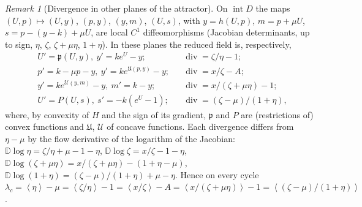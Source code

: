\documentclass[11pt,a4paper]{article}
\numberwithin{equation}{section}
\theoremstyle{remark}\newtheorem{remark}[theorem]{Remark}
\newcommand{\avg}[1]{\left\langle #1\right\rangle}
\DeclareMathOperator{\inter}{int}
\DeclareMathOperator{\diver}{div}
\begin{document}
\begin{remark}[Divergence in other planes of the attractor]\label{rem:planes}
On $\inter D$ the maps $(U,p)\mapsto(U,y)$, $(p,y)$, $(y,m)$, $(U,s)$, with $y=h(U,p)$, $m=p+\mu U$,
$s=p-(y-k)+\mu U$, are local $C^1$ diffeomorphisms (Jacobian determinants, up to sign, $\eta$, $\zeta$, $\zeta+\mu\eta$, $1+\eta$). In
these planes the reduced field is, respectively,
\[
\begin{aligned}
&U'=\mathfrak p(U,y),\ y'=ke^{U}-y;&&\diver=\zeta/\eta-1;\\
&p'=k-\mu p-y,\ y'=ke^{\mathfrak U(p,y)}-y;&&\diver=x/\zeta-A;\\
&y'=ke^{\mathcal U(y,m)}-y,\ m'=k-y;&&\diver=x/(\zeta+\mu\eta)-1;\\
&U'=P(U,s),\ s'=-k(e^{U}-1);&&\diver=(\zeta-\mu)/(1+\eta),
\end{aligned}
\]
where, by convexity of $H$ and the sign of its gradient, $\mathfrak p$ and $P$ are (restrictions of) convex functions
and $\mathfrak U$, $\mathcal U$ of concave functions. Each divergence differs from $\eta-\mu$ by the flow derivative
of the logarithm of the Jacobian: $\mathbb D\log\eta=\zeta/\eta+\mu-1-\eta$, $\mathbb D\log\zeta=x/\zeta-1-\eta$,
$\mathbb D\log(\zeta+\mu\eta)=x/(\zeta+\mu\eta)-(1+\eta-\mu)$, $\mathbb D\log(1+\eta)=(\zeta-\mu)/(1+\eta)+\mu-\eta$.
Hence on every cycle $\lambda_c=\avg\eta-\mu=\avg{\zeta/\eta}-1=\avg{x/\zeta}-A=\avg{x/(\zeta+\mu\eta)}-1
=\avg{(\zeta-\mu)/(1+\eta)}$.
\end{remark}
\end{document}
